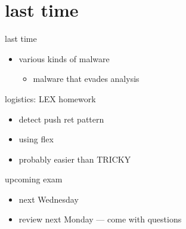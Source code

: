 \begin{frame}
    \titlepage
\end{frame}

\section{last time}

\begin{frame}{last time}
    \begin{itemize}
    \item various kinds of  malware
        \begin{itemize}
        \item malware that evades analysis
        \end{itemize}
    \end{itemize}
\end{frame}

\begin{frame}{logistics: LEX homework}
    \begin{itemize}
    \item detect push ret pattern
    \item using flex
    \vspace{.5cm}
    \item probably easier than TRICKY
    \end{itemize}
\end{frame}

\begin{frame}{upcoming exam}
    \begin{itemize}
    \item next Wednesday
    \item review next Monday --- come with questions
    \end{itemize}
\end{frame}

